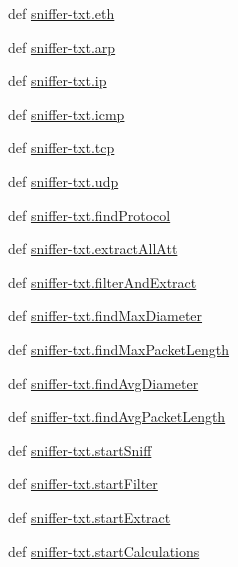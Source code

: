 \begin{DoxyCompactItemize}
\item 
def \hyperlink{namespacesniffer-txt_a061fe1f57af0a7458d9e38b6bf1b2a88}{sniffer-\/txt.\-eth}
\item 
def \hyperlink{namespacesniffer-txt_abc65eaac289d33105c95307d68f24769}{sniffer-\/txt.\-arp}
\item 
def \hyperlink{namespacesniffer-txt_abb5456e3f8d74d0e85eb2fc068d42cc4}{sniffer-\/txt.\-ip}
\item 
def \hyperlink{namespacesniffer-txt_afca619ca4d1891b0c7899e4721427c5b}{sniffer-\/txt.\-icmp}
\item 
def \hyperlink{namespacesniffer-txt_a9ad1e72b19f523891ac14d171b8f2b0b}{sniffer-\/txt.\-tcp}
\item 
def \hyperlink{namespacesniffer-txt_a509b189f514c4238d9c28c2bd715f6d0}{sniffer-\/txt.\-udp}
\item 
def \hyperlink{namespacesniffer-txt_a240089abd5c152fb82ce7289fc75d5e1}{sniffer-\/txt.\-find\-Protocol}
\item 
def \hyperlink{namespacesniffer-txt_ae22e9ecb478ea603d637fe90c3fe61a1}{sniffer-\/txt.\-extract\-All\-Att}
\item 
def \hyperlink{namespacesniffer-txt_a6b49db8e892d65b76b00bb9fa0a2ba76}{sniffer-\/txt.\-filter\-And\-Extract}
\item 
def \hyperlink{namespacesniffer-txt_a5a8bc5adccebbb4ddfbed74f77bc5d9a}{sniffer-\/txt.\-find\-Max\-Diameter}
\item 
def \hyperlink{namespacesniffer-txt_a973d635e5691fe63f56aaafe8f862c88}{sniffer-\/txt.\-find\-Max\-Packet\-Length}
\item 
def \hyperlink{namespacesniffer-txt_a44ea72bf1be691bb014367d7ef72f586}{sniffer-\/txt.\-find\-Avg\-Diameter}
\item 
def \hyperlink{namespacesniffer-txt_a3ae8ab6aeb782958f195c93f11f54dd2}{sniffer-\/txt.\-find\-Avg\-Packet\-Length}
\item 
def \hyperlink{namespacesniffer-txt_ae8b20fad336053239242cb921a4ba329}{sniffer-\/txt.\-start\-Sniff}
\item 
def \hyperlink{namespacesniffer-txt_a5ad104bdd8be25d3ab524fabc3e83875}{sniffer-\/txt.\-start\-Filter}
\item 
def \hyperlink{namespacesniffer-txt_ac9ff90e46b3170d01c19e5108b4e7662}{sniffer-\/txt.\-start\-Extract}
\item 
def \hyperlink{namespacesniffer-txt_a48b4b2e8eaec0dd5d241c185b72c8b25}{sniffer-\/txt.\-start\-Calculations}
\item 

\end{DoxyCompactItemize}
